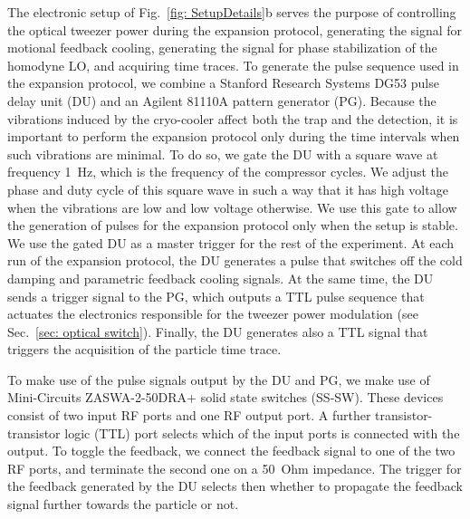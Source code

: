\documentclass[aps, 
reprint, 
notitlepage,  superscriptaddress, 
onecolumn]{revtex4-1}
\newcommand{\<}{\langle}
\renewcommand{\>}{\rangle}
\begin{document}
The electronic setup of Fig.~\ref{fig: SetupDetails}b serves the purpose of controlling the optical tweezer power during the expansion protocol, generating the signal for motional feedback cooling, generating the signal for phase stabilization of the homodyne LO, and acquiring time traces. 
%
To generate the pulse sequence used in the expansion protocol, we combine a Stanford
Research Systems DG53 pulse delay unit (DU) and an Agilent 81110A pattern generator (PG).
%
Because the vibrations induced by the cryo-cooler affect both the trap and the detection, it is important to perform the expansion protocol only during the time intervals when such vibrations are minimal. 
%
To do so, we gate the DU with a square wave at frequency \SI{1}{Hz}, which is the frequency of the compressor cycles.
%
We adjust the phase and duty cycle of this square wave in such a way that it has high voltage when the vibrations are low and low voltage otherwise. 
%
We use this gate to allow the generation of pulses for the expansion protocol only when the setup is stable.
%
We use the gated DU as a master trigger for the rest of the experiment. At each run of the expansion protocol, the DU generates a pulse that switches off the cold damping and parametric feedback cooling signals. 
%
At the same time, the DU sends a trigger signal to the PG, which outputs a TTL pulse sequence that actuates the electronics responsible for the tweezer power modulation (see Sec.~\ref{sec: optical switch}). 
%
%
Finally, the DU generates also a TTL signal that triggers the acquisition of the particle time trace. 
%

To make use of the pulse signals output by the DU and PG, we make use of Mini-Circuits ZASWA-2-50DRA+ solid state switches (SS-SW). These devices consist of two input RF ports and one RF output port. A further transistor-transistor logic (TTL) port selects which of the input ports is connected with the output. 
%
To toggle the feedback, we connect the feedback signal to one of the two RF ports, and terminate the second one on a \SI{50}{Ohm} impedance. 
%
The trigger for the feedback generated by the DU selects then whether to propagate the feedback signal further towards the particle or not. 
\end{document}
